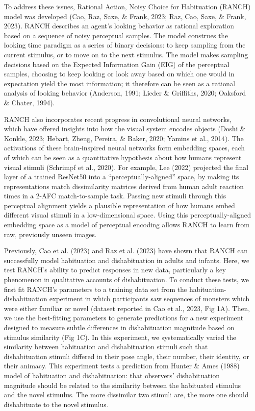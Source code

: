 \documentclass[10pt, letterpaper]{article}
\begin{document}
To address these issues, Rational Action, Noisy Choice for Habituation
(RANCH) model was developed (Cao, Raz, Saxe, \& Frank, 2023; Raz, Cao,
Saxe, \& Frank, 2023). RANCH describes an agent's looking behavior as
rational exploration based on a sequence of noisy perceptual samples.
The model construes the looking time paradigm as a series of binary
decisions: to keep sampling from the current stimulus, or to move on to
the next stimulus. The model makes sampling decisions based on the
Expected Information Gain (EIG) of the perceptual samples, choosing to
keep looking or look away based on which one would in expectation yield
the most information; it therefore can be seen as a rational analysis of
looking behavior (Anderson, 1991; Lieder \& Griffiths, 2020; Oaksford \&
Chater, 1994).

RANCH also incorporates recent progress in convolutional neural
networks, which have offered insights into how the visual system encodes
objects (Doshi \& Konkle, 2023; Hebart, Zheng, Pereira, \& Baker, 2020;
Yamins et al., 2014). The activations of these brain-inspired neural
networks form embedding spaces, each of which can be seen as a
quantitative hypothesis about how humans represent visual stimuli
(Schrimpf et al., 2020). For example, Lee (2022) projected the final
layer of a trained ResNet50 into a ``perceptually-aligned'' space, by
making its representations match dissimilarity matrices derived from
human adult reaction times in a 2-AFC match-to-sample task. Passing new
stimuli through this perceptual alignment yields a plausible
representation of how humans embed different visual stimuli in a
low-dimensional space. Using this perceptually-aligned embedding space
as a model of perceptual encoding allows RANCH to learn from raw,
previously unseen images.

Previously, Cao et al. (2023) and Raz et al. (2023) have shown that
RANCH can successfully model habituation and dishabituation in adults
and infants. Here, we test RANCH's ability to predict responses in new
data, particularly a key phenomenon in qualitative accounts of
dishabituation. To conduct these tests, we first fit RANCH's parameters
to a training data set from the habituation-dishabituation experiment in
which participants saw sequences of monsters which were either familiar
or novel (dataset reported in Cao et al., 2023, Fig 1A). Then, we use
the best-fitting parameters to generate predictions for a new experiment
designed to measure subtle differences in dishabituation magnitude based
on stimulus similarity (Fig 1C). In this experiment, we systematically
varied the similarity between habituation and dishabituation stimuli
such that dishabituation stimuli differed in their pose angle, their
number, their identity, or their animacy. This experiment tests a
prediction from Hunter \& Ames (1988) model of habituation and
dishabituation: that observers' dishabituation magnitude should be
related to the similarity between the habituated stimulus and the novel
stimulus. The more dissimilar two stimuli are, the more one should
dishabituate to the novel stimulus.
\end{document}
